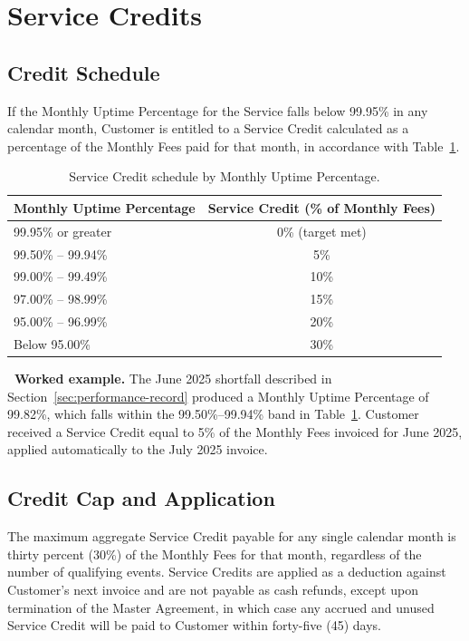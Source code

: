 \section{Service Credits}
\label{sec:credits}

\subsection{Credit Schedule}
If the Monthly Uptime Percentage for the Service falls below 99.95\% in any calendar month, Customer is entitled to a Service Credit calculated as a percentage of the Monthly Fees paid for that month, in accordance with Table~\ref{tab:credits}.

\begin{table}[H]
\centering
\small
\begin{tabular}{lc}
\toprule
\textbf{Monthly Uptime Percentage} & \textbf{Service Credit (\% of Monthly Fees)} \\
\midrule
99.95\% or greater & 0\% (target met) \\
99.50\% -- 99.94\% & 5\% \\
99.00\% -- 99.49\% & 10\% \\
97.00\% -- 98.99\% & 15\% \\
95.00\% -- 96.99\% & 20\% \\
Below 95.00\% & 30\% \\
\bottomrule
\end{tabular}
\caption{Service Credit schedule by Monthly Uptime Percentage.}
\label{tab:credits}
\end{table}

\begin{creditbox}
\textbf{\faExclamationTriangle\ Worked example.} The June 2025 shortfall described in Section~\ref{sec:performance-record} produced a Monthly Uptime Percentage of 99.82\%, which falls within the 99.50\%--99.94\% band in Table~\ref{tab:credits}. Customer received a Service Credit equal to 5\% of the Monthly Fees invoiced for June 2025, applied automatically to the July 2025 invoice.
\end{creditbox}

\subsection{Credit Cap and Application}
\label{sec:credit-cap}
The maximum aggregate Service Credit payable for any single calendar month is thirty percent (30\%) of the Monthly Fees for that month, regardless of the number of qualifying events. Service Credits are applied as a deduction against Customer's next invoice and are not payable as cash refunds, except upon termination of the Master Agreement, in which case any accrued and unused Service Credit will be paid to Customer within forty-five (45) days.


